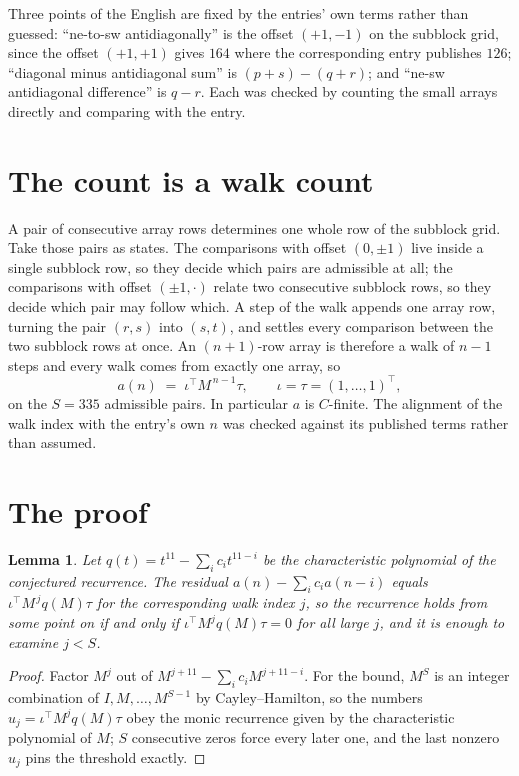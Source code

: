\documentclass[11pt,a4paper]{article}
\theoremstyle{plain}
\newtheorem{lemma}[theorem]{Lemma}
\theoremstyle{definition}
\begin{document}
Three points of the English are fixed by the entries' own terms rather than guessed:
``ne-to-sw antidiagonally'' is the offset $(+1,-1)$ on the subblock grid, since the offset
$(+1,+1)$ gives $164$ where the corresponding entry publishes $126$; ``diagonal minus
antidiagonal sum'' is $(p+s)-(q+r)$; and ``ne-sw antidiagonal difference'' is $q-r$. Each was
checked by counting the small arrays directly and comparing with the entry.

\section{The count is a walk count}

A pair of consecutive array rows determines one whole row of the subblock grid. Take those
pairs as states. The comparisons with offset $(0,\pm1)$ live inside a single subblock row, so
they decide which pairs are admissible at all; the comparisons with offset $(\pm1,\cdot)$
relate two consecutive subblock rows, so they decide which pair may follow which. A step of the
walk appends one array row, turning the pair $(r,s)$ into $(s,t)$, and settles every comparison
between the two subblock rows at once. An $(n+1)$-row array is therefore a walk of $n-1$ steps
and every walk comes from exactly one array, so
\[
a(n)\;=\;\iota^{\!\top}M^{\,n-1}\tau,\qquad \iota=\tau=(1,\dots,1)^{\!\top},
\]
on the $S=335$ admissible pairs. In particular $a$ is $C$-finite. The alignment of the walk
index with the entry's own $n$ was checked against its published terms rather than assumed.

\section{The proof}

\begin{lemma}\label{lem:crit}
Let $q(t)=t^{11}-\sum_i c_it^{11-i}$ be the characteristic polynomial of the
conjectured recurrence. The residual $a(n)-\sum_ic_ia(n-i)$ equals
$\iota^{\!\top}M^{\,j}q(M)\tau$ for the corresponding walk index $j$, so the recurrence
holds from some point on if and only if $\iota^{\!\top}M^{j}q(M)\tau=0$ for all large $j$,
and it is enough to examine $j<S$.
\end{lemma}

\begin{proof}
Factor $M^{j}$ out of $M^{j+11}-\sum_ic_iM^{j+11-i}$. For the bound, $M^{S}$
is an integer combination of $I,M,\dots,M^{S-1}$ by Cayley--Hamilton, so the numbers
$u_j=\iota^{\!\top}M^{j}q(M)\tau$ obey the monic recurrence given by the characteristic
polynomial of $M$; $S$ consecutive zeros force every later one, and the last nonzero $u_j$
pins the threshold exactly.
\end{proof}
\end{document}
